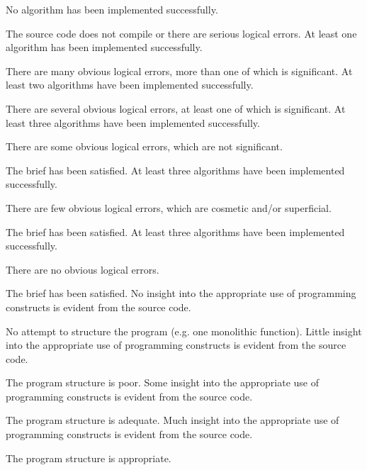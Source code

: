 \documentclass{../fal_assignment}
\begin{document}
\begin{markingrubric}
%
        \grade\fail 	No algorithm has been implemented successfully.
            \par 		The source code does not compile or there are serious logical errors.
        \grade 		At least one algorithm has been  implemented successfully.
            \par 		There are many obvious logical errors, more than one of which is significant.   
        \grade 		At least two algorithms have been  implemented successfully.
            \par 		There are several obvious logical errors, at least one of which is significant. 
        \grade 		At least three algorithms have been  implemented successfully.
            \par 		There are some obvious logical errors, which are not significant. 
            \par		The brief has been satisfied.
        \grade 		At least three algorithms have been  implemented successfully.
            \par 		There are few obvious logical errors, which are cosmetic and/or superficial.
            \par		The brief has been satisfied.     
        \grade 		At least three algorithms have been  implemented successfully.
            \par		There are no obvious logical errors.
            \par		The brief has been satisfied.
%
        \grade\fail No insight into the appropriate use of programming constructs is evident from the source code.
            \par No attempt to structure the program (e.g. one monolithic function).
        \grade Little insight into the appropriate use of programming constructs is evident from the source code.
            \par The program structure is poor.
        \grade Some insight into the appropriate use of programming constructs is evident from the source code.
            \par The program structure is adequate.
        \grade Much insight into the appropriate use of programming constructs is evident from the source code.
            \par The program structure is appropriate.

\end{markingrubric}
\end{document}
